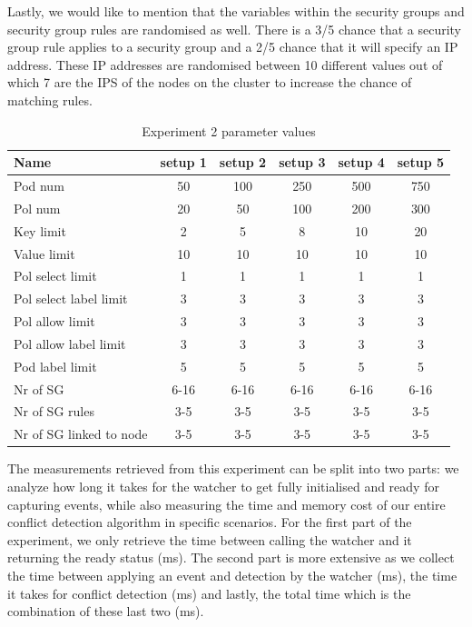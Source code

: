 Lastly, we would like to mention that the variables within the security groups and security group rules are randomised as well. There is a 3\slash 5 chance that a security group rule applies to a security group and a 2\slash 5 chance that it will specify an IP address. These IP addresses are randomised between 10 different values out of which 7 are the IPS of the nodes on the cluster to increase the chance of matching rules. 


\begin{table}[H]
    \centering
    \begin{tabular}{|l|c|c|c|c|c|}
        \hline
        \textbf{Name} & \textbf{setup 1} & \textbf{setup 2} & \textbf{setup 3} & \textbf{setup 4} & \textbf{setup 5}\\
        \hline
        Pod num & 50 & 100 & 250 & 500 & 750 \\
        Pol num & 20 & 50 & 100 & 200 & 300 \\
        Key limit & 2 & 5 & 8 & 10 & 20 \\
        Value limit & 10 & 10 & 10 & 10 & 10 \\
        Pol select limit & 1 & 1 & 1 & 1 & 1 \\
        Pol select label limit & 3 & 3 & 3 & 3 & 3 \\
        Pol allow limit & 3 & 3 & 3 & 3 & 3 \\
        Pol allow label limit & 3 & 3 & 3 & 3 & 3 \\
        Pod label limit & 5 & 5 & 5 & 5 & 5 \\
        Nr of SG & 6-16 & 6-16 & 6-16 & 6-16 & 6-16\\
        Nr of SG rules & 3-5 &3-5 & 3-5 & 3-5 & 3-5\\
        Nr of SG linked to node & 3-5 &3-5 & 3-5 & 3-5 & 3-5\\
	
        \hline
    \end{tabular}
    \caption{Experiment 2 parameter values}
    \label{tab:exp2pars}
\end{table}

The measurements retrieved from this experiment can be split into two parts: we analyze how long it takes for the watcher to get fully initialised and ready for capturing events, while also measuring the time and memory cost of our entire conflict detection algorithm in specific scenarios. For the first part of the experiment, we only retrieve the time between calling the watcher and it returning the ready status (ms). The second part is more extensive as we collect the time between applying an event and detection by the watcher (ms), the time it takes for conflict detection (ms) and lastly, the total time which is the combination of these last two (ms). 

